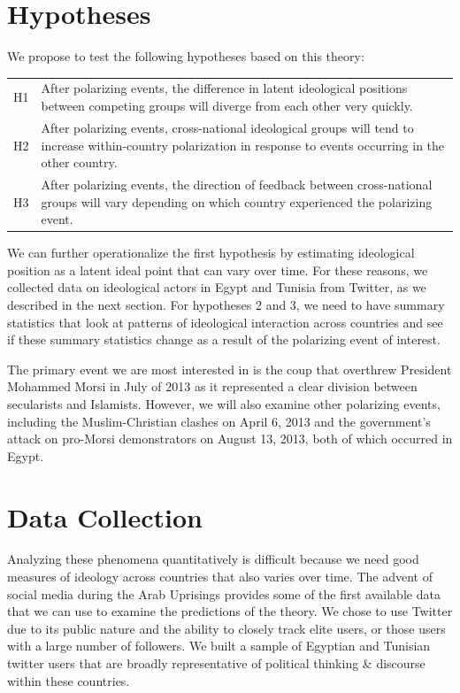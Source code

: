 \documentclass[12pt]{article}
\begin{document}
\section*{Hypotheses}

We propose to test the following hypotheses based on this theory:

\begin{tabular}{lp{10cm}}
	H1 & After polarizing events, the difference in latent ideological positions between competing groups will diverge from each other very quickly.\\
	H2 & After polarizing events, cross-national ideological groups will tend to increase within-country polarization in response to events occurring in the other country.\\
	H3 & After polarizing events, the direction of feedback between cross-national groups will vary depending on which country experienced the polarizing event.
\end{tabular}

We can further operationalize the first hypothesis by estimating ideological position as a latent ideal point that can vary over time. For these reasons, we collected data on ideological actors in Egypt and Tunisia from Twitter, as we described in the next section. For hypotheses 2 and 3, we need to have summary statistics that look at patterns of ideological interaction across countries and see if these summary statistics change as a result of the polarizing event of interest. 

The primary event we are most interested in is the coup that overthrew President Mohammed Morsi in July of 2013 as it represented a clear division between secularists and Islamists. However, we will also examine other polarizing events, including the Muslim-Christian clashes on April 6, 2013 and the government's attack on pro-Morsi demonstrators on August 13, 2013, both of which occurred in Egypt.
 
\section*{Data Collection}
Analyzing these phenomena quantitatively is difficult because we need good measures of ideology across countries that also varies over time. The advent of social media during the Arab Uprisings provides some of the first available data that we can use to examine the predictions of the theory. We chose to use Twitter due to its public nature and the ability to closely track elite users, or those users with a large number of followers. We built a sample of Egyptian and Tunisian twitter users that are broadly representative of political thinking \& discourse within these countries.
\end{document}
